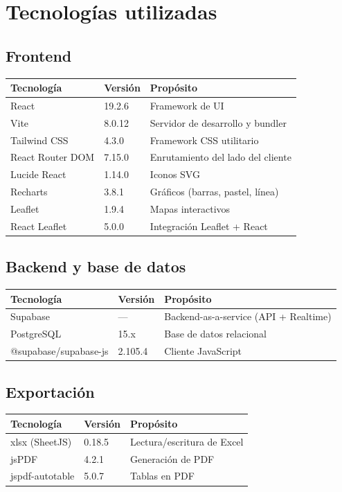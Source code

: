 \documentclass[12pt]{article}
\begin{document}
\section{Tecnolog\'ias utilizadas}

\subsection{Frontend}
\begin{tabular}{lll}
  \toprule
  \textbf{Tecnolog\'ia} & \textbf{Versi\'on} & \textbf{Prop\'osito} \\
  \midrule
  React & 19.2.6 & Framework de UI \\
  Vite & 8.0.12 & Servidor de desarrollo y bundler \\
  Tailwind CSS & 4.3.0 & Framework CSS utilitario \\
  React Router DOM & 7.15.0 & Enrutamiento del lado del cliente \\
  Lucide React & 1.14.0 & Iconos SVG \\
  Recharts & 3.8.1 & Gr\'aficos (barras, pastel, l\'inea) \\
  Leaflet & 1.9.4 & Mapas interactivos \\
  React Leaflet & 5.0.0 & Integraci\'on Leaflet + React \\
  \bottomrule
\end{tabular}

\subsection{Backend y base de datos}
\begin{tabular}{lll}
  \toprule
  \textbf{Tecnolog\'ia} & \textbf{Versi\'on} & \textbf{Prop\'osito} \\
  \midrule
  Supabase & --- & Backend-as-a-service (API + Realtime) \\
  PostgreSQL & 15.x & Base de datos relacional \\
  @supabase/supabase-js & 2.105.4 & Cliente JavaScript \\
  \bottomrule
\end{tabular}

\subsection{Exportaci\'on}
\begin{tabular}{lll}
  \toprule
  \textbf{Tecnolog\'ia} & \textbf{Versi\'on} & \textbf{Prop\'osito} \\
  \midrule
  xlsx (SheetJS) & 0.18.5 & Lectura/escritura de Excel \\
  jsPDF & 4.2.1 & Generaci\'on de PDF \\
  jspdf-autotable & 5.0.7 & Tablas en PDF \\
  \bottomrule
\end{tabular}
\end{document}
